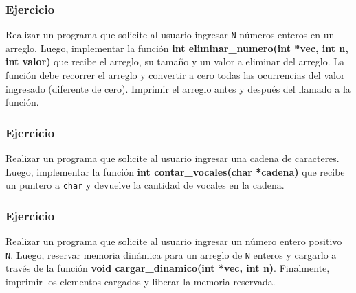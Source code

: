 \subsubsection{Ejercicio}
Realizar un programa que solicite al usuario ingresar \texttt{N} números enteros en un arreglo. Luego, implementar la función \textbf{int eliminar\_numero(int *vec, int n, int valor)} que recibe el arreglo, su tamaño y un valor a eliminar del arreglo. La función debe recorrer el arreglo y convertir a cero todas las ocurrencias del valor ingresado (diferente de cero). Imprimir el arreglo antes y después del llamado a la función.

\subsubsection{Ejercicio}
Realizar un programa que solicite al usuario ingresar una cadena de caracteres. Luego, implementar la función \textbf{int contar\_vocales(char *cadena)} que recibe un puntero a \texttt{char} y devuelve la cantidad de vocales en la cadena.

\subsubsection{Ejercicio}
Realizar un programa que solicite al usuario ingresar un número entero positivo \texttt{N}. Luego, reservar memoria dinámica para un arreglo de \texttt{N} enteros y cargarlo a través de la función \textbf{void cargar\_dinamico(int *vec, int n)}. Finalmente, imprimir los elementos cargados y liberar la memoria reservada.
